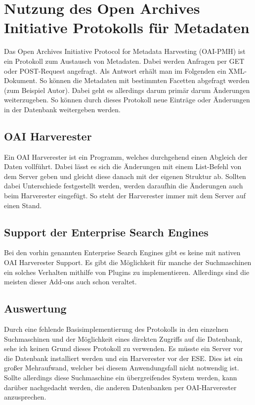 \chapter{Nutzung des Open Archives Initiative Protokolls für Metadaten}

Das Open Archives Initiative Protocol for Metadata Harvesting (OAI-PMH) ist ein Protokoll zum Austausch von Metadaten. Dabei werden Anfragen per GET oder POST-Request angefragt. Als Antwort erhält man im Folgenden ein XML-Dokument. So können die Metadaten mit bestimmten Facetten abgefragt werden (zum Beispiel Autor). Dabei geht es allerdings darum primär darum Änderungen weiterzugeben. So können durch dieses Protokoll neue Einträge oder Änderungen in der Datenbank weitergeben werden.
\cite{DeutscheNationalBibliothek.2019}

\section{OAI Harverester}

Ein OAI Harverester ist ein Programm, welches durchgehend einen Abgleich der Daten vollführt. Dabei lässt es sich die Änderungen mit einem List-Befehl von dem Server geben und gleicht diese danach mit der eigenen Struktur ab. Sollten dabei Unterschiede festgestellt werden, werden daraufhin die Änderungen auch beim Harverester eingefügt. So steht der Harverester immer mit dem Server auf einen Stand.
\cite{DeutscheNationalBibliothek.2019}

\section{Support der Enterprise Search Engines}

Bei den vorhin genannten Enterprise Search Engines gibt es keine mit nativen OAI Harverester Support. Es gibt die Möglichkeit für manche der Suchmaschinen ein solches Verhalten mithilfe von Plugins zu implementieren. Allerdings sind die meisten dieser Add-ons auch schon veraltet.

\section{Auswertung}

Durch eine fehlende Basisimplementierung des Protokolls in den einzelnen Suchmaschinen und der Möglichkeit eines direkten Zugriffs auf die Datenbank, sehe ich keinen Grund dieses Protokoll zu verwenden. Es müsste ein Server vor die Datenbank installiert werden und ein Harverester vor der ESE. Dies ist ein großer Mehraufwand, welcher bei diesem Anwendungsfall nicht notwendig ist. Sollte allerdings diese Suchmaschine ein übergreifendes System werden, kann darüber nachgedacht werden, die anderen Datenbanken per OAI-Harverester anzusprechen.